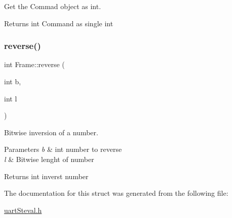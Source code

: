 Get the Commad object as int. 

\begin{DoxyReturn}{Returns}
int Command as single int 
\end{DoxyReturn}
\mbox{\label{structFrame_ac2ac164080c777c32ed8e9e69686f73b}} 
\subsubsection{\texorpdfstring{reverse()}{reverse()}}
{\footnotesize\ttfamily int Frame\+::reverse (\begin{DoxyParamCaption}\item[{int}]{b,  }\item[{int}]{l }\end{DoxyParamCaption})\hspace{0.3cm}{\ttfamily [inline]}}



Bitwise inversion of a number. 


\begin{DoxyParams}{Parameters}
{\em b} & int number to reverse \\
\hline
{\em l} & Bitwise lenght of number \\
\hline
\end{DoxyParams}
\begin{DoxyReturn}{Returns}
int inverst number 
\end{DoxyReturn}


The documentation for this struct was generated from the following file\+:\begin{DoxyCompactItemize}
\item 
\hyperlink{uartSteval_8h}{uart\+Steval.\+h}\end{DoxyCompactItemize}
